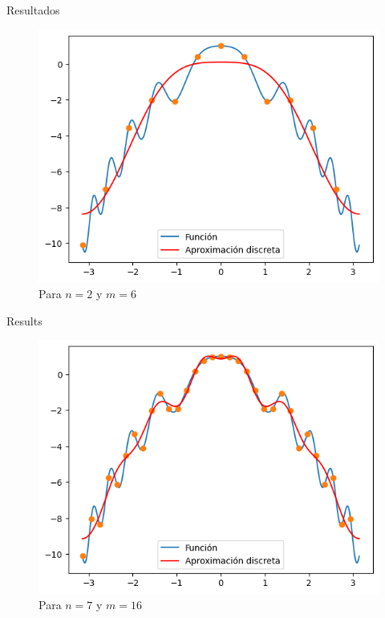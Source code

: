 \begin{frame}{Resultados}
    \begin{figure}
        \centering
        \includegraphics[width=.75\paperwidth]{p7-Aprox-discreta.png}
        \caption{Para $n=2$ y $m=6$}
    \end{figure}
\end{frame}

\begin{frame}{Results}
    \begin{figure}
        \centering
        \includegraphics[width=.75\paperwidth]{p7-A-discreta2.png}
        \caption{Para $n=7$ y $m=16$}
    \end{figure}
\end{frame}

